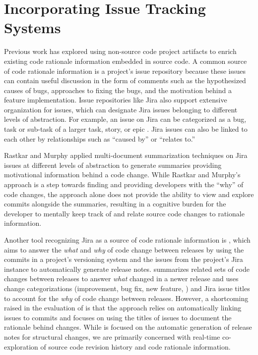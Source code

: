 
\section{Incorporating Issue Tracking Systems}

Previous work has explored using non-source code project artifacts to enrich existing code 
rationale information embedded in source code. 
A common source of code rationale information is a project's issue repository because these 
issues can contain useful discussion in the form of comments such as the hypothesized causes of bugs, 
approaches to fixing the bugs, and the motivation behind a feature implementation. 
Issue repositories like Jira also support extensive organization for issues,
which can designate Jira issues belonging to different levels of abstraction.
For example, an issue on Jira can be categorized as a bug, task or sub-task of a larger task, story, or epic \cite{jira-issue-types}.
Jira issues can also be linked to each other by relationships such as ``caused by'' or ``relates to.''

Rastkar and Murphy \cite{rastkar_why_2013} applied multi-document summarization techniques on Jira issues 
at different levels of abstraction to generate summaries providing motivational information behind a code change.
While Rastkar and Murphy's approach is a step towards finding and providing developers with the ``why'' of code changes, 
the approach alone does not provide the ability to view and explore commits alongside the summaries,
resulting in a cognitive burden for the developer to mentally 
keep track of and relate source code changes to rationale information.

Another tool recognizing Jira as a source of code rationale information is  \cite{moreno_arena_2017}, 
which aims to answer the \emph{what} and \emph{why} of code change between releases by 
using the commits in a project's versioning system and the issues from the project's Jira instance 
to automatically generate release notes. 
 summarizes related sets of code changes between releases to answer \emph{what} 
changed in a newer release and uses change categorizations (\eg improvement, bug fix, new feature, \etc) 
and Jira issue titles to account for the \emph{why} of code change between releases.
However, a shortcoming raised in the evaluation of  is that the approach 
relies on automatically linking issues to commits and focuses on 
using the titles of issues to document the rationale behind changes.
While  is focused on the automatic generation of release notes for structural changes,
we are primarily concerned with real-time co-exploration of source code revision history 
and code rationale information.

